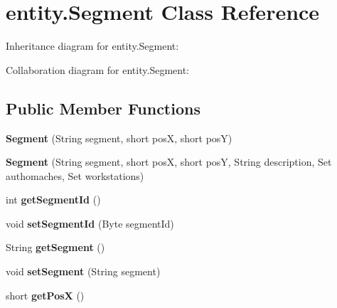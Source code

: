 \hypertarget{classentity_1_1_segment}{}\section{entity.\+Segment Class Reference}
\label{classentity_1_1_segment}


Inheritance diagram for entity.\+Segment\+:


Collaboration diagram for entity.\+Segment\+:
\subsection*{Public Member Functions}
\begin{DoxyCompactItemize}
\item 
\mbox{\label{classentity_1_1_segment_a4198d8bf80daca7aec679e294b962f28}} 
{\bfseries Segment} (String segment, short posX, short posY)
\item 
\mbox{\label{classentity_1_1_segment_a7d23189c239956e9a6580bab38b4dab1}} 
{\bfseries Segment} (String segment, short posX, short posY, String description, Set authomaches, Set workstations)
\item 
\mbox{\label{classentity_1_1_segment_a1e00c79b38639370d9b116a6c77a5b4a}} 
int {\bfseries get\+Segment\+Id} ()
\item 
\mbox{\label{classentity_1_1_segment_a49190cea3afa331fe0c5fbc10e6214ec}} 
void {\bfseries set\+Segment\+Id} (Byte segment\+Id)
\item 
\mbox{\label{classentity_1_1_segment_af96f1caaaaf411990b64270c830c3456}} 
String {\bfseries get\+Segment} ()
\item 
\mbox{\label{classentity_1_1_segment_abb149147dc902ee032e3bff790010cec}} 
void {\bfseries set\+Segment} (String segment)
\item 
\mbox{\label{classentity_1_1_segment_a0c740639c2fb9fc93add3e63adb4879a}} 
short {\bfseries get\+PosX} ()
\item 
\mbox{\label{classentity_1_1_segment_a8a0c1e5d9ccefcefe2fd5d28ff5703dd}} 

\end{DoxyCompactItemize}
